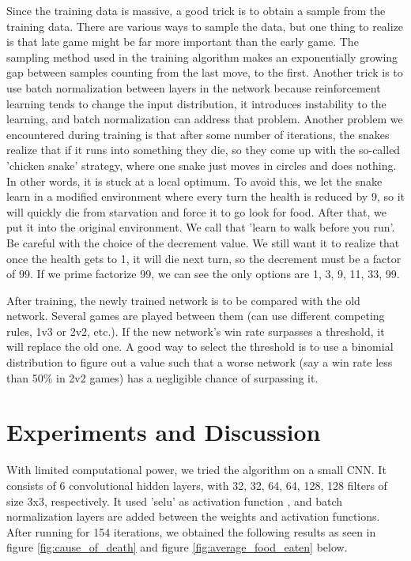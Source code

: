 \documentclass{article}
\begin{document}
Since the training data is massive, a good trick is to obtain a sample from the
training data. There are various ways to sample the data, but one thing to
realize is that late game might be far more important than the early game. The
sampling method used in the training algorithm makes an exponentially growing
gap between samples counting from the last move, to the first. Another trick
is to use batch normalization between layers in the network because
reinforcement learning tends to change the input distribution, it introduces
instability to the learning, and batch normalization can address that problem.
Another problem we encountered during training is that after some number of
iterations, the snakes realize that if it runs into something they die, so they
come up with the so-called 'chicken snake' strategy, where one snake just
moves in circles and does nothing. In other words, it is stuck at a local optimum.
To avoid this, we let the snake learn in a modified environment where every turn
the health is reduced by 9, so it will quickly die from starvation and force it
to go look for food. After that, we put it into the original environment. We
call that 'learn to walk before you run'. Be careful with the choice of the
decrement value. We still want it to realize that once the health gets to 1, it
will die next turn, so the decrement must be a factor of 99. If we prime
factorize 99, we can see the only options are 1, 3, 9, 11, 33, 99.

After training, the newly trained network is to be compared with the old network.
Several games are played between them (can use different competing rules,
1v3 or 2v2, etc.). If the new network's win rate surpasses a threshold, it will
replace the old one. A good way to select the threshold is to use a binomial
distribution to figure out a value such that a worse network (say a win rate
less than 50\% in 2v2 games) has a negligible chance of surpassing it.


\section{Experiments and Discussion}

With limited computational power, we tried the algorithm on a small CNN. It
consists of 6 convolutional hidden layers, with 32, 32, 64, 64, 128, 128 filters
of size 3x3, respectively. It used 'selu' as activation function
\cite{SeluPaper}, and batch normalization layers are added between the weights
and activation functions. After running for 154 iterations, we obtained the
following results as seen in figure \ref{fig:cause_of_death} and figure
\ref{fig:average_food_eaten} below.
\end{document}
